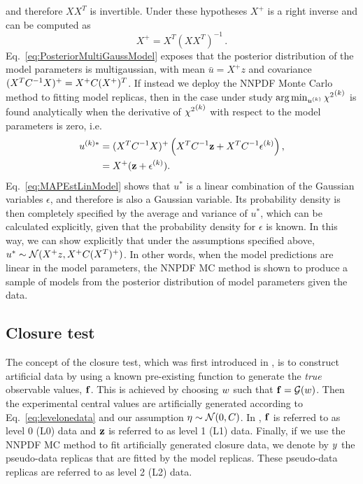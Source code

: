 and therefore $X X^T$ is invertible. Under these hypotheses $X^+$ is a
right inverse and can be computed as
\begin{equation}
    \label{eq:RightInverse}
    X^+ = X^T \left(X X^T\right)^{-1}\, .
\end{equation}
Eq.~\ref{eq:PosteriorMultiGaussModel} exposes that the posterior distribution of
the model parameters is multigaussian, with mean $\bar{u} = X^+z$ and covariance
$(X^TC^{-1}_{}X)^+ = X^+ C (X^+)^T$. If instead we deploy the NNPDF Monte
Carlo method to fitting model replicas, then in the case under study
$\arg\min_{u^{(k)}} {\chi^2}^{(k)}$ is found analytically when the derivative of
${\chi^2}^{(k)}$ with respect to the model parameters is zero, i.e.
\begin{equation}
    \label{eq:MAPEstLinModel}
    \begin{split}
        u^{(k) *} &= (X^TC^{-1}_{}X)^{+}
        \left( X^T C^{-1}_{} \mathbf{z} + X^T C^{-1}_{} \mathbf{\epsilon}^{(k)} \right), \\
        &= X^+ (\mathbf{z} + \mathbf{\epsilon}^{(k)}).
    \end{split}
\end{equation}
Eq.~\ref{eq:MAPEstLinModel} shows that $u^*$ is a linear combination of the
Gaussian variables $\epsilon$, and therefore is also a Gaussian variable. Its
probability density is then completely specified by the average and variance of
$u^*$, which can be calculated explicitly, given that the probability density
for $\epsilon$ is known.  In this way, we can show explicitly that under the
assumptions specified above, $u^{*} \sim \mathcal{N}( X^+z, X^+ C (X^T)^+)$.
In other words, when the model predictions are linear in the model parameters,
the NNPDF MC method is shown to produce a sample of models from the posterior
distribution of model parameters given the data.

\subsection{Closure test}

The concept of the closure test, which was first introduced in \cite{nnpdf30},
is to construct artificial data by using a known pre-existing function to
generate the {\em true} observable values, $\mathbf{f}$. This is achieved by
choosing $w$ such that $\mathbf{f} = \mathcal{G}(w)$. Then the
experimental central values are artificially generated according to
Eq.~\ref{eq:levelonedata} and our assumption $\mathbf{\eta} \sim \mathcal{N}(0,
C)$. In \cite{nnpdf30}, $\mathbf{f}$ is referred to as level 0 (L0) data and
$\mathbf{z}$ is referred to as level 1 (L1) data. Finally, if we use the NNPDF
MC method to fit artificially generated closure data, we denote by $y$ the
pseudo-data replicas that are fitted by the model replicas. These pseudo-data
replicas are referred to as level 2 (L2) data.

